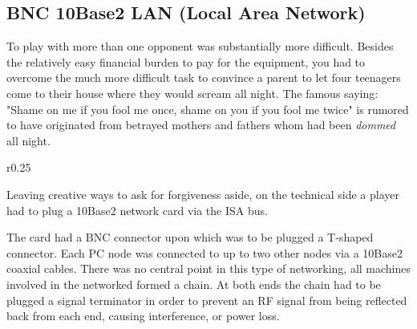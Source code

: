 \subsection{BNC 10Base2 LAN (Local Area Network)}
To play with more than one opponent was substantially more difficult. Besides the relatively easy financial burden to pay for the equipment, you had to overcome the much more difficult task to convince a parent to let four teenagers come to their house where they would scream all night. The famous saying: "Shame on me if you fool me once, shame on you if you fool me twice" is rumored to have originated from betrayed mothers and fathers whom had been \textit{dommed} all night.\\
\par



\begin{wrapfigure}[7]{r}{0.25\textwidth}
\centering
{}
\end{wrapfigure}

Leaving creative ways to ask for forgiveness aside, on the technical side a player had to plug a 10Base2 network card via the ISA bus. \\
\par The card had a BNC connector upon which was to be plugged a T-shaped connector. Each PC node was connected to up to two other nodes via a 10Base2 coaxial cables. There was no central point in this type of networking, all machines involved in the networked formed a chain. At both ends the chain had to be plugged a signal terminator in order to prevent an RF signal from being reflected back from each end, causing interference, or power loss.



